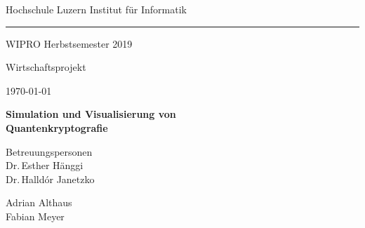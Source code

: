 \documentclass[a4paper,10.2pt,pdftex]{scrartcl}%
\begin{document}
\begin{titlepage} 
 \begin{center} 
    \thispagestyle{empty}
  {\small  Hochschule Luzern \hfill Institut für Informatik   \\[.75ex]
\hrule 
\vspace{0.75ex}
WIPRO  \hfill Herbstsemester 2019\\  

}


\vspace{14ex}



{\LARGE Wirtschaftsprojekt}


\vspace{2ex}

{\large \today}\\
\vspace{2ex}



\vspace{9ex}


{\huge\bfseries\textsf{Simulation und Visualisierung von \\[-1mm] Quantenkryptografie \\[5.5mm] }}



\vspace{5ex}

Betreuungspersonen \\[2mm] Dr.\,Esther Hänggi \\ Dr.\,Halldór Janetzko\\[3mm]


\vspace{8ex}

{\Large Adrian Althaus \\[2mm] Fabian Meyer  \Large {}}

\vspace{8ex}


 

\end{center}
\end{titlepage}
\end{document}
